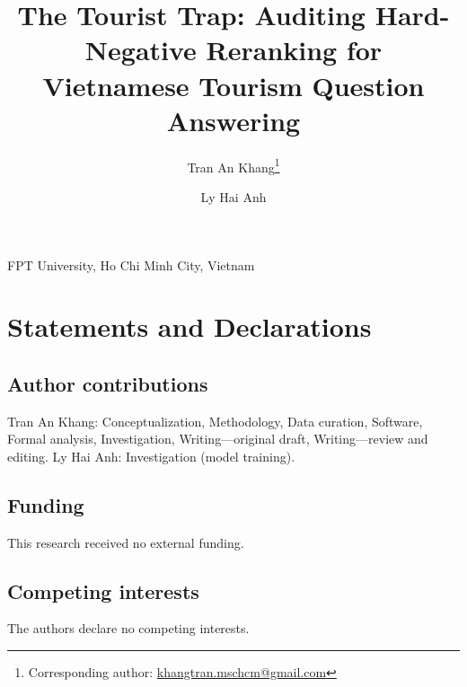 \documentclass[12pt]{article}
\title{The Tourist Trap: Auditing Hard-Negative Reranking for Vietnamese Tourism Question Answering}
\author{Tran An Khang\thanks{Corresponding author: \href{mailto:khangtran.mschcm@gmail.com}{khangtran.mschcm@gmail.com}} \and Ly Hai Anh}
\date{}
\begin{document}
\maketitle
\begin{center}FPT University, Ho Chi Minh City, Vietnam\end{center}
\section*{Statements and Declarations}

\subsection*{Author contributions}
Tran An Khang: Conceptualization, Methodology, Data curation, Software,
Formal analysis, Investigation, Writing---original draft, Writing---review
and editing. Ly Hai Anh: Investigation (model training).
\subsection*{Funding}
This research received no external funding.
\subsection*{Competing interests}
The authors declare no competing interests.
\end{document}
